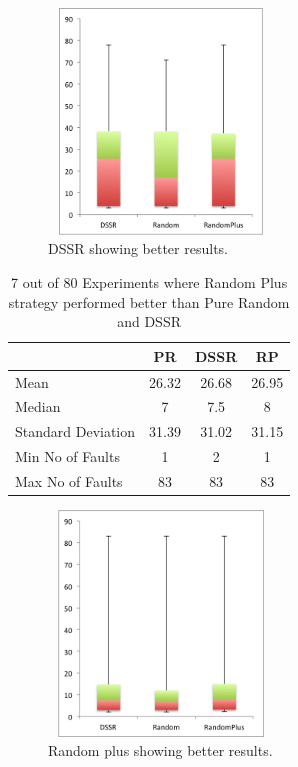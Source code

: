 \documentclass[conference]{IEEEtran}
\begin{document}
\begin{figure}[ht]
\centering
\includegraphics[width=6cm,height=6cm]{DSSRBetter.png}
\caption{DSSR showing better results.}
\label{fig:Result1}
\end{figure}



\begin{table}[H]
\caption{7 out of 80 Experiments where Random Plus strategy performed better than Pure Random and DSSR}
\centering
\begin{tabular}{|l|c|c|c|}
\hline\hline
 				& PR			&  DSSR 			& RP \\[1ex]
\hline
Mean  			&    26.32		&  26.68			&  26.95\\
Median 			&    7 		&  7.5 			&  8 \\
Standard Deviation 	&    31.39		&  31.02			&  31.15\\
Min No of Faults	&    1			&  2				&  1\\
Max No of Faults 	&    83		&  83				&  83\\
\hline
\end{tabular}
\label{table:result3}
\end{table}


\begin{figure}[ht]
\centering
\includegraphics[width=6cm,height=6cm]{RandomPlusBetter.png}
\caption{Random plus showing better results.}
\label{fig:Result1}
\end{figure}
\end{document}
